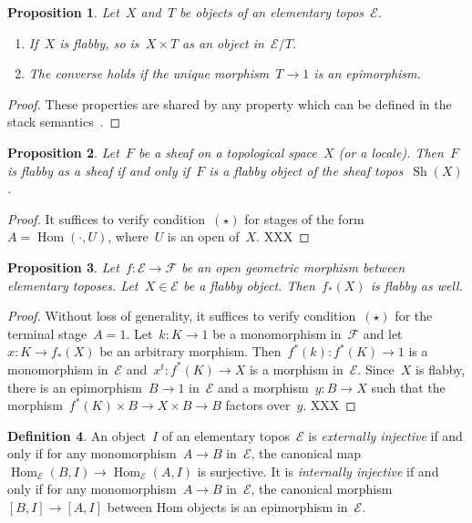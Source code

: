 \documentclass[oneside]{amsart}
\theoremstyle{definition}
\newtheorem{defn}{Definition}[section]
\theoremstyle{plain}
\newtheorem{prop}[defn]{Proposition}
\theoremstyle{remark}
\newcommand{\E}{\mathcal{E}}
\newcommand{\F}{\mathcal{F}}
\DeclareMathOperator{\Hom}{Hom}
\DeclareMathOperator{\Sh}{Sh}
\renewcommand{\_}{\mathpunct{.}\,}
\begin{document}
\begin{prop}\label{prop:basic-properties-of-flabby-objects}
Let~$X$ and~$T$ be objects of an elementary topos~$\E$.
\begin{enumerate}
\item If~$X$ is flabby, so is~$X \times T$ as an object in~$\E/T$.
\item The converse holds if the unique morphism~$T \to 1$ is an epimorphism.
\end{enumerate}
\end{prop}

\begin{proof}These properties are shared by any property which can be defined
in the stack semantics~\cite[Lemma~7.3]{shulman:stack-semantics}.
\end{proof}

\begin{prop}\label{prop:flabby-sheaves-objects}
Let~$F$ be a sheaf on a topological space~$X$ (or a locale).
Then~$F$ is flabby as a sheaf if and only if~$F$ is a flabby object of the
sheaf topos~$\Sh(X)$.
\end{prop}

\begin{proof}It suffices to verify condition~$({\star})$ for stages of the
form~$A = \Hom(\cdot,U)$, where~$U$ is an open of~$X$. XXX
\end{proof}

\begin{prop}Let~$f : \E \to \F$ be an open geometric morphism between
elementary toposes. Let~$X \in \E$ be a flabby object. Then~$f_*(X)$ is flabby
as well.\end{prop}

\begin{proof}Without loss of generality, it suffices to verify
condition~$({\star})$ for the terminal stage~$A = 1$. Let~$k : K \to 1$ be a
monomorphism in~$\F$ and let~$x : K \to f_*(X)$ be an arbitrary morphism.
Then~$f^*(k) : f^*(K) \to 1$ is a monomorphism in~$\E$ and~$x^t : f^*(K) \to X$
is a morphism in~$\E$. Since~$X$ is flabby, there is an epimorphism~$B \to 1$
in~$\E$ and a morphism~$y : B \to X$ such that the morphism~$f^*(K) \times B \to X
\times B \to B$ factors over~$y$. XXX
\end{proof}

\begin{defn}An object~$I$ of an elementary topos~$\E$ is \emph{externally
injective} if and only if for any monomorphism~$A \to B$ in~$\E$, the canonical
map~$\Hom_\E(B,I) \to \Hom_\E(A,I)$ is surjective. It is \emph{internally
injective} if and only if for any monomorphism~$A \to B$ in~$\E$, the canonical
morphism~$[B,I] \to [A,I]$ between Hom objects is an epimorphism in~$\E$.
\end{defn}
\end{document}
